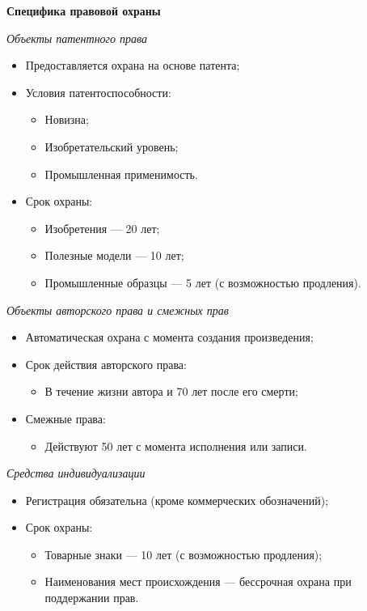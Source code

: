 \textbf{Специфика правовой охраны}

\textit{Объекты патентного права}

\begin{itemize}
    \item Предоставляется охрана на основе патента;
    \item Условия патентоспособности:
    \begin{itemize}
        \item Новизна;
        \item Изобретательский уровень;
        \item Промышленная применимость.
    \end{itemize}
    \item Срок охраны:
    \begin{itemize}
        \item Изобретения --- 20 лет;
        \item Полезные модели --- 10 лет;
        \item Промышленные образцы --- 5 лет (с возможностью продления).
    \end{itemize}
\end{itemize}

\textit{Объекты авторского права и смежных прав}

\begin{itemize}
    \item Автоматическая охрана с момента создания произведения;
    \item Срок действия авторского права:
    \begin{itemize}
        \item В течение жизни автора и 70 лет после его смерти;
    \end{itemize}
    \item Смежные права:
    \begin{itemize}
        \item Действуют 50 лет с момента исполнения или записи.
    \end{itemize}
\end{itemize}

\textit{Средства индивидуализации}
\begin{itemize}
    \item Регистрация обязательна (кроме коммерческих обозначений);
    \item Срок охраны:
    \begin{itemize}
        \item Товарные знаки --- 10 лет (с возможностью продления);
        \item Наименования мест происхождения --- бессрочная охрана при поддержании прав.
    \end{itemize}
\end{itemize}

